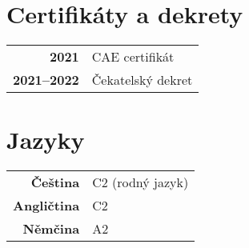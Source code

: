 \documentclass{modernsimplecv}
\newlength{\leftcolwidth}
\begin{document}
\begin{paracol}{2}
{\begin{minipage}[t]{\leftcolwidth}
\vspace{2em}
\end{minipage}

\begin{minipage}[t]{\leftcolwidth}
\section*{\large{Certifikáty a dekrety}}
\begin{tabular}{>{\footnotesize\bfseries}r >{\footnotesize}p{}}
    2021 & CAE certifikát \\
    2021--2022 & Čekatelský dekret \\
\end{tabular}
\bigskip

\end{minipage}\hfill

\vspace{1em}

\begin{minipage}[t]{\leftcolwidth}
    \section*{\large{Jazyky}}
    \begin{tabular}{>{\footnotesize\bfseries}r >{\footnotesize}p{}}
        Čeština & C2 (rodný jazyk)\\
        Angličtina & C2 \\
        Němčina & A2 \\
    \end{tabular}
    \bigskip
    
    \end{minipage}\hfill
    
\vspace{2em}

\begin{minipage}[t]{\leftcolwidth}

\end{minipage}}
\end{paracol}
\end{document}
